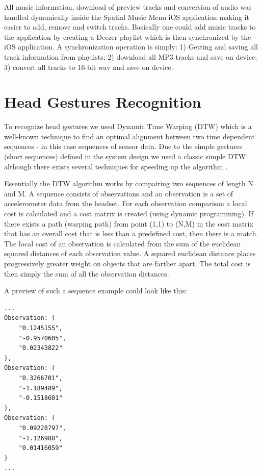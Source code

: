 All music information, download of preview tracks and conversion of audio was handled dynamically inside the Spatial Music Menu iOS application making it easier to add, remove and switch tracks. Basically one could add music tracks to the application by creating a Deezer playlist which is then synchronized by the iOS application. A synchronization operation is simply: 1) Getting and saving all track information from playlists; 2) download all MP3 tracks and save on device; 3) convert all tracks to 16-bit wav and save on device.


\section{Head Gestures Recognition}
\label{sec:implementationgesturerecognition}
To recognize head gestures we used Dynamic Time Warping (DTW) which is a well-known technique to find an optimal alignment between two time dependent sequences \cite{muller_dynamic_2007} - in this case sequences of sensor data. Due to the simple gestures (short sequences) defined in the system design we used a classic simple DTW although there exists several techniques for speeding up the algorithm \cite{muller_dynamic_2007,salvador_toward_2007,akl_accelerometer-based_2010}. 

Essentially the DTW algorithm works by compairing two sequences of length N and M. A sequence consists of observations and an observation is a set of accelerometer data from the headset. For each observation comparison a local cost is calculated and a cost matrix is created (using dynamic programming). If there exists a path (warping path) from point (1,1) to (N,M) in the cost matrix that has an overall cost that is less than a predefined cost, then there is a match. The local cost of an observation is calculated from the sum of the euclidean squared distances of each observation value. A squared euclidean distance places progressively greater weight on objects that are farther apart. The total cost is then simply the sum of all the observation distances.

\newpage

A preview of such a sequence example could look like this:

\begin{lstlisting}
...
Observation: (
    "0.1245155",
    "-0.9570605",
    "0.02343822"
),
Observation: (
    "0.3266701",
    "-1.189489",
    "-0.1518601"
),
Observation: (
    "0.09228797",
    "-1.126988",
    "0.01416059"
)
...
\end{lstlisting}

